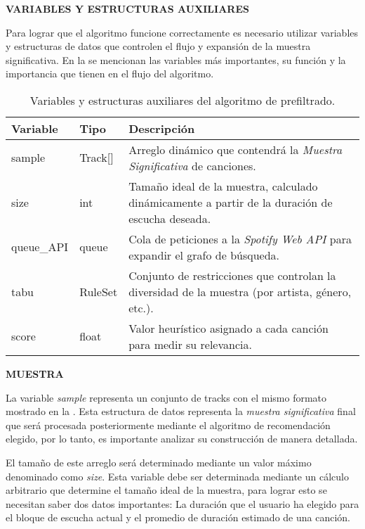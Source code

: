\textbf{VARIABLES Y ESTRUCTURAS AUXILIARES}

Para lograr que el algoritmo funcione correctamente es necesario utilizar variables y estructuras de datos que controlen el flujo y expansión de la muestra significativa. En la  se mencionan las variables más importantes, su función y la importancia que tienen en el flujo del algoritmo.

\begin{table}[h!]
\centering
\begin{tabular}{l l p{8cm}}
\toprule
\textbf{Variable} & \textbf{Tipo} & \textbf{Descripción} \\
\midrule
sample & Track[] & Arreglo dinámico que contendrá la \textit{Muestra Significativa} de canciones. \\
size & int & Tamaño ideal de la muestra, calculado dinámicamente a partir de la duración de escucha deseada. \\
queue\_API & queue & Cola de peticiones a la \textit{Spotify Web API} para expandir el grafo de búsqueda. \\
tabu & RuleSet & Conjunto de restricciones que controlan la diversidad de la muestra (por artista, género, etc.). \\
score & float & Valor heurístico asignado a cada canción para medir su relevancia. \\
\bottomrule
\end{tabular}
\caption{Variables y estructuras auxiliares del algoritmo de prefiltrado.}
\label{tab:variables_prefiltrado}
\end{table}

\textbf{MUESTRA}

La variable \textit{sample} representa un conjunto de tracks con el mismo formato mostrado en la . Esta estructura de datos representa la \textit{muestra significativa} final que será procesada posteriormente mediante el algoritmo de recomendación elegido, por lo tanto, es importante analizar su construcción de manera detallada.

\newpage

El tamaño de este arreglo será determinado mediante un valor máximo denominado como \textit{size}. Esta variable debe ser determinada mediante un cálculo arbitrario que determine el tamaño ideal de la muestra, para lograr esto se necesitan saber dos datos importantes: La duración que el usuario ha elegido para el bloque de escucha actual y el promedio de duración estimado de una canción.

